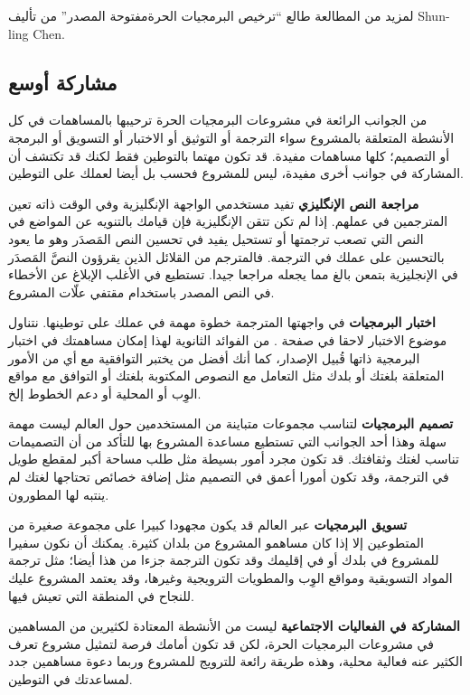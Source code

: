 لمزيد من المطالعة طالع “ترخيص البرمجيات الحرة مفتوحة
المصدر” من تأليف Shun-ling Chen.



\subsection{مشاركة أوسع}
من الجوانب الرائعة في مشروعات البرمجيات الحرة ترحيبها بالمساهمات في كل
الأنشطة المتعلقة بالمشروع سواء الترجمة أو التوثيق أو الاختبار أو
التسويق أو البرمجة أو التصميم؛ كلها مساهمات مفيدة. قد تكون مهتما
بالتوطين فقط لكنك قد تكتشف أن المشاركة في جوانب أخرى مفيدة، ليس للمشروع
فحسب بل أيضا لعملك على التوطين.

{\bf مراجعة النص الإنگليزي} تفيد مستخدمي الواجهة الإنگليزية وفي الوقت
ذاته تعين المترجمين في عملهم. إذا لم تكن تتقن الإنگليزية فإن قيامك
بالتنويه عن المواضع في النص التي تصعب ترجمتها أو تستحيل يفيد في تحسين
النص المَصدَر وهو ما يعود بالتحسين على عملك في الترجمة. فالمترجم من
القلائل الذين يقرؤون النصَّ المَصدَر في الإنجليزية بتمعن بالغ مما يجعله
مراجعا جيدا. تستطيع في الأغلب الإبلاغ عن الأخطاء في النص المصدر
باستخدام مقتفي علّات المشروع.

{\bf اختبار البرمجيات} في واجهتها المترجمة خطوة مهمة في عملك على
توطينها. نتناول موضوع الاختبار لاحقا في صفحة
\at[ref:34441726]. من الفوائد الثانوية لهذا إمكان مساهمتك في
اختبار البرمجية ذاتها قُبيل الإصدار، كما أنك أفضل من يختبر التوافقية مع
أي من الأمور المتعلقة بلغتك أو بلدك مثل التعامل مع النصوص المكتوبة
بلغتك أو التوافق مع مواقع الوِب أو المحلية أو دعم الخطوط إلخ.

{\bf تصميم البرمجيات} لتناسب مجموعات متباينة من المستخدمين حول العالم
ليست مهمة سهلة وهذا أحد الجوانب التي تستطيع مساعدة المشروع بها للتأكد
من أن التصميمات تناسب لغتك وثقافتك. قد تكون مجرد أمور بسيطة مثل طلب
مساحة أكبر لمقطع طويل في الترجمة، وقد تكون أمورا أعمق في التصميم مثل
إضافة خصائص تحتاجها لغتك لم ينتبه لها المطورون.

{\bf تسويق البرمجيات} عبر العالم قد يكون مجهودا كبيرا على مجموعة صغيرة
من المتطوعين إلا إذا كان مساهمو المشروع من بلدان كثيرة. يمكنك أن نكون
سفيرا للمشروع في بلدك أو في إقليمك وقد تكون الترجمة جزءا من هذا أيضا؛
مثل ترجمة المواد التسويقية ومواقع الوِب والمطويات الترويجية وغيرها، وقد
يعتمد المشروع عليك للنجاح في المنطقة التي تعيش فيها.

{\bf المشاركة في الفعاليات الاجتماعية} ليست من الأنشطة المعتادة لكثيرين
من المساهمين في مشروعات البرمجيات الحرة، لكن قد تكون أمامك فرصة لتمثيل
مشروع تعرف الكثير عنه فعالية محلية، وهذه طريقة رائعة للترويج للمشروع
وربما دعوة مساهمين جدد لمساعدتك في التوطين.

